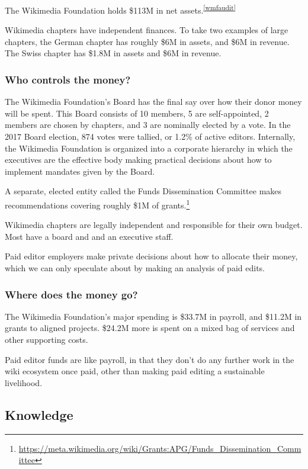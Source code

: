 \documentclass[format=sigconf, authorversion]{acmart}
\begin{document}
The Wikimedia Foundation holds \$113M in net assets.\textsuperscript{\ref{wmfaudit}}

Wikimedia chapters have independent finances.  To take two examples of large chapters, the German chapter has roughly \$6M in assets, and \$6M in revenue.  The Swiss chapter has \$1.8M in assets and \$6M in revenue.

\subsubsection{Who controls the money?}

The Wikimedia Foundation's Board has the final say over how their donor money will be spent.  This Board consists of 10 members, 5 are self-appointed, 2 members are chosen by chapters, and 3 are nominally elected by a vote.  In the 2017 Board election, 874 votes were tallied, or 1.2\% of active editors.  Internally, the Wikimedia Foundation is organized into a corporate hierarchy in which the executives are the effective body making practical decisions about how to implement mandates given by the Board.

A separate, elected entity called the Funds Dissemination Committee makes recommendations covering roughly \$1M of grants.\footnote{\url{https://meta.wikimedia.org/wiki/Grants:APG/Funds_Dissemination_Committee}}

Wikimedia chapters are legally independent and responsible for their own budget.  Most have a board and and an executive staff.

Paid editor employers make private decisions about how to allocate their money, which we can only speculate about by making an analysis of paid edits.

\subsubsection{Where does the money go?}

The Wikimedia Foundation's major spending is \$33.7M in payroll, and \$11.2M in grants to aligned projects.  \$24.2M more is spent on a mixed bag of services and other supporting costs.

Paid editor funds are like payroll, in that they don't do any further work in the wiki ecosystem once paid, other than making paid editing a sustainable livelihood.

\subsection{Knowledge}
\end{document}
